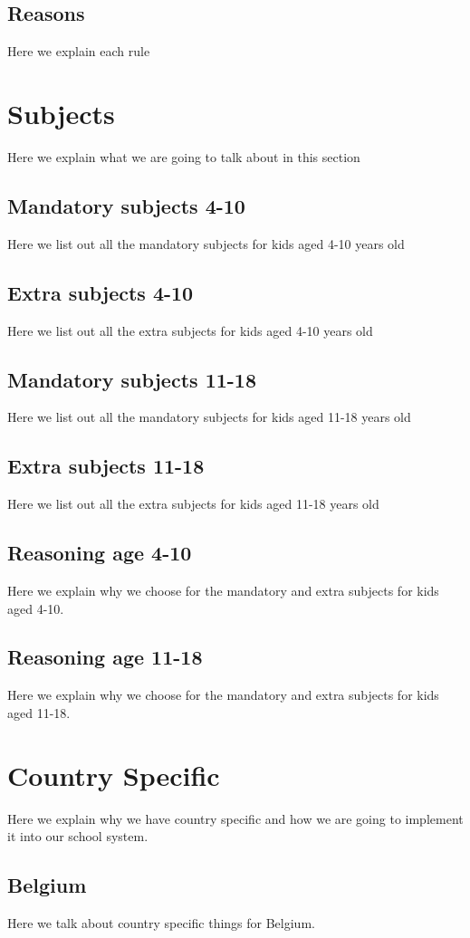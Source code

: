 \documentclass[titlepage]{article}
\begin{document}
\subsection{Reasons}
Here we explain each rule

\newpage
\section{Subjects}
Here we explain what we are going to talk about in this section
\subsection{Mandatory subjects 4-10}
Here we list out all the mandatory subjects for kids aged 4-10 years old
\subsection{Extra subjects 4-10}
Here we list out all the extra subjects for kids aged 4-10 years old
\subsection{Mandatory subjects 11-18}
Here we list out all the mandatory subjects for kids aged 11-18 years old
\subsection{Extra subjects 11-18}
Here we list out all the extra subjects for kids aged 11-18 years old
\subsection{Reasoning age 4-10}
Here we explain why we choose for the mandatory and extra subjects for kids aged 4-10.
\subsection{Reasoning age 11-18}
Here we explain why we choose for the mandatory and extra subjects for kids aged 11-18.

\newpage
\section{Country Specific}
Here we explain why we have country specific and how we are going to implement it into our school system.

\subsection{Belgium}
Here we talk about country specific things for Belgium.
\end{document}
